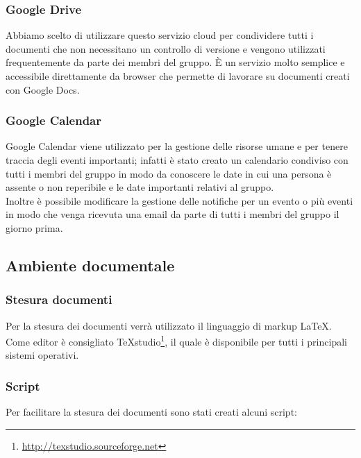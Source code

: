 \subsubsection{Google Drive}

Abbiamo scelto di utilizzare questo servizio cloud per condividere tutti i documenti che non necessitano un controllo di versione e vengono utilizzati frequentemente da parte dei membri del gruppo. 
È un servizio molto semplice e accessibile direttamente da browser che permette di lavorare su documenti creati con Google Docs.

\subsubsection{Google Calendar}
Google Calendar viene utilizzato per la gestione delle risorse umane e per tenere traccia degli eventi importanti; infatti è stato creato un calendario condiviso con tutti i membri del gruppo in modo da conoscere le date in cui una persona è assente o non reperibile e le date importanti relativi al gruppo.\\
Inoltre è possibile modificare la gestione delle notifiche per un evento o più eventi in modo che venga ricevuta una email da parte di tutti i membri del gruppo il giorno prima.

\subsection{Ambiente documentale}

\subsubsection{Stesura documenti}

Per la stesura dei documenti verrà utilizzato il linguaggio di markup \LaTeX.
Come editor è consigliato TeXstudio\footnote{\url{http://texstudio.sourceforge.net}}, il quale è disponibile per tutti i principali sistemi operativi.

\subsubsection{Script}

Per facilitare la stesura dei documenti sono stati creati alcuni script:

